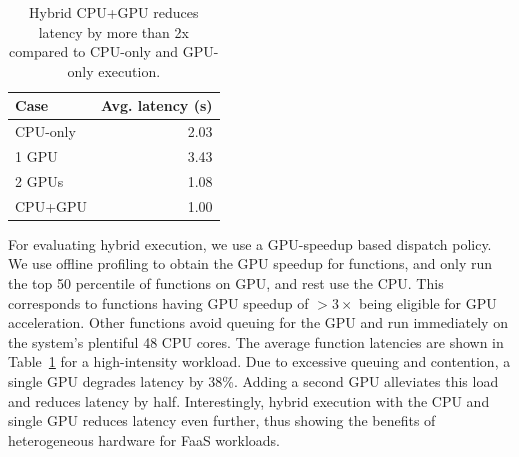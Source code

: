 

\begin{table}
  \centering
  \caption{Hybrid CPU+GPU reduces latency by more than 2x compared to CPU-only and GPU-only execution.}
  \label{tab:cpu-gpu}
  \begin{tabular}{|l|r|}
  \hline
  Case & Avg. latency (s) \\ \hline
  CPU-only & 2.03 \\
  1 GPU & 3.43 \\
  2 GPUs & 1.08 \\
  CPU+GPU & 1.00 \\
  \hline 
\end{tabular}
\end{table}

For evaluating hybrid execution, we use a GPU-speedup based dispatch policy.
We use offline profiling to obtain the GPU speedup for functions, and only run the top 50 percentile of functions on GPU, and rest use the CPU.
This corresponds to functions having GPU speedup of $>3\times$ being eligible for GPU acceleration. 
Other functions avoid queuing for the GPU and run immediately on the system's plentiful 48 CPU cores. 
The average function latencies are shown in Table~\ref{tab:cpu-gpu} for a high-intensity workload. 
Due to excessive queuing and contention, a single GPU degrades latency by 38\%. Adding a second GPU alleviates this load and reduces latency by half.
Interestingly, hybrid execution with the CPU and single GPU reduces latency even further, thus showing the benefits of heterogeneous hardware for FaaS workloads. 



